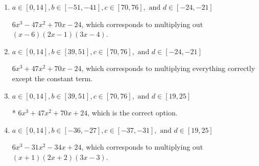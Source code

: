 \documentclass{extbook}[14pt]
\begin{document}
\begin{enumerate}
{\begin{enumerate}[label=\Alph*.]
$6x^{3} -25 x^{2} -62 x -24$, which corresponds to multiplying out $(x + 1)(2x -2)(3x -3)$.
\item \( a \in [0, 14], b \in [-51, -41], c \in [70, 76], \text{ and } d \in [-24, -21] \)

$6x^{3} -47 x^{2} +70 x -24$, which corresponds to multiplying out $(x -6)(2x -1)(3x -4)$.
\item \( a \in [0, 14], b \in [39, 51], c \in [70, 76], \text{ and } d \in [-24, -21] \)

$6x^{3} +47 x^{2} +70 x -24$, which corresponds to multiplying everything correctly except the constant term.
\item \( a \in [0, 14], b \in [39, 51], c \in [70, 76], \text{ and } d \in [19, 25] \)

* $6x^{3} +47 x^{2} +70 x + 24$, which is the correct option.
\item \( a \in [0, 14], b \in [-36, -27], c \in [-37, -31], \text{ and } d \in [19, 25] \)

$6x^{3} -31 x^{2} -34 x + 24$, which corresponds to multiplying out $(x + 1)(2x + 2)(3x -3)$.
\end{enumerate}

}
\end{enumerate}
\end{document}
